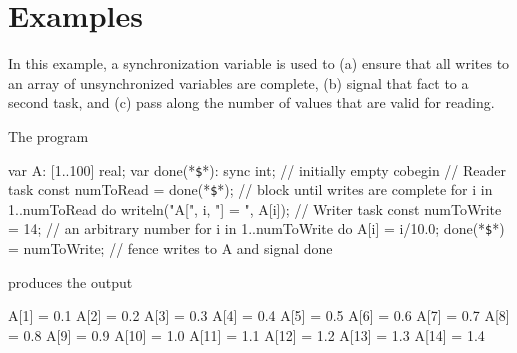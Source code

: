 
\section{Examples}
\label{MCM_examples}
\begin{example}
  In this example, a synchronization variable is used to (a) ensure that
  all writes to an array of unsynchronized variables are complete, (b)
  signal that fact to a second task, and (c) pass along the number of
  values that are valid for reading.

  The program
\begin{chapel}
var A: [1..100] real;
var done(*\texttt{\$}*): sync int;           // initially empty
cobegin {
  { // Reader task
    const numToRead = done(*\texttt{\$}*);   // block until writes are complete
    for i in 1..numToRead do
      writeln("A[", i, "] = ", A[i]);
  }
  {  // Writer task
    const numToWrite = 14;     // an arbitrary number
    for i in 1..numToWrite do
      A[i] = i/10.0;
    done(*\texttt{\$}*) = numToWrite;        // fence writes to A and signal done
  }
}
\end{chapel}
  produces the output
\begin{chapelprintoutput}
A[1] = 0.1
A[2] = 0.2
A[3] = 0.3
A[4] = 0.4
A[5] = 0.5
A[6] = 0.6
A[7] = 0.7
A[8] = 0.8
A[9] = 0.9
A[10] = 1.0
A[11] = 1.1
A[12] = 1.2
A[13] = 1.3
A[14] = 1.4
\end{chapelprintoutput}
\end{example}


